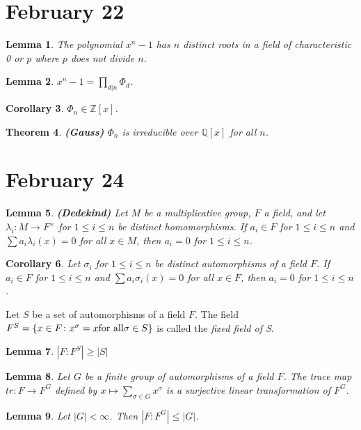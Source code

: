\documentclass[letterpaper]{article}
\newtheorem{theorem}{Theorem}[section]
\newtheorem{lemma}[theorem]{Lemma}
\newtheorem{corollary}[theorem]{Corollary}
\newenvironment{definition}[1][Definition]{\begin{trivlist}
\item[\hskip \labelsep {\bfseries #1}]}{\end{trivlist}}
\begin{document}
\section{February 22}

\begin{lemma}
The polynomial $x^n - 1$ has $n$ distinct roots in a field of characteristic 0 or $p$ where $p$ does not divide $n$.
\end{lemma}

\begin{lemma}
$x^n - 1 = \displaystyle\prod_{d | n} \Phi_d$.
\end{lemma}

\begin{corollary}
$\Phi_n \in \mathbb{Z}[x]$.
\end{corollary}

\begin{theorem}
\emph{\textbf{(Gauss)}}
$\Phi_n$ is irreducible over $\mathbb{Q}[x]$ for all $n$.
\end{theorem}

\section{February 24}

\begin{lemma}
\emph{\textbf{(Dedekind)}}
Let $M$ be a multiplicative group, $F$ a field, and let $\lambda_i \colon M \rightarrow F^{\times}$ for $1 \leq i \leq n$ be distinct homomorphisms. If $a_i \in F$ for $1 \leq i \leq n$ and $\sum a_i \lambda_i (x) = 0$ for all $x \in M$, then $a_i = 0$ for $1 \leq i \leq n$.
\end{lemma}

\begin{corollary}
Let $\sigma_i$ for $1 \leq i \leq n$ be distinct automorphisms of a field $F$. If $a_i \in F$ for $1 \leq i \leq n$ and $\sum a_i \sigma_i (x) = 0$ for all $x \in F$, then $a_i = 0$ for $1 \leq i \leq n$.
\end{corollary}

\begin{definition}
Let $S$ be a set of automorphisms of a field $F$.  The field $F^S = \left\{x \in F \colon x^{\sigma} = x \textnormal{for all} \sigma \in S\right\}$ is called the \emph{fixed field of S}.
\end{definition}

\begin{lemma}
$|F \colon F^S| \geq |S|$
\end{lemma}

\begin{lemma}
Let $G$ be a finite group of automorphisms of a field $F$.  The trace map $tr \colon F \rightarrow F^G$ defined by $x \mapsto \sum_{\sigma \in G} x^\sigma$ is a surjective linear transformation of $F^G$.
\end{lemma}

\begin{lemma}
Let $|G| < \infty$. Then $|F \colon F^G| \leq |G|$.
\end{lemma}
\end{document}
